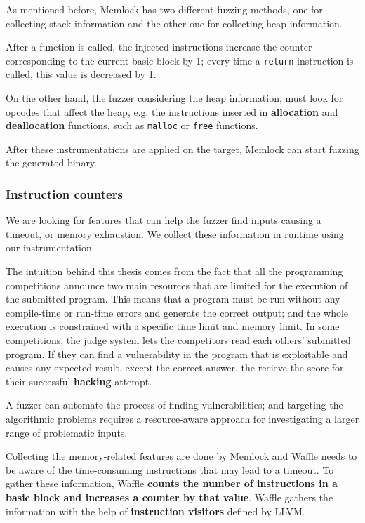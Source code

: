 As mentioned before, Memlock has two different fuzzing methods, one for collecting stack information and the other one for collecting heap information.

After a function is called, the injected instructions increase the counter corresponding to the current basic block by 1; every time a \texttt{return} instruction is called, this value is decreased by 1.

On the other hand, the fuzzer considering the heap information, must look for opcodes that affect the heap, e.g. the instructions inserted in \textbf{allocation} and \textbf{deallocation} functions, such as \texttt{malloc} or \texttt{free} functions.

After these instrumentations are applied on the target, Memlock can start fuzzing the generated binary.

\subsubsection{Instruction counters}

We are looking for features that can help the fuzzer find inputs causing a timeout, or memory exhaustion. We collect these information in runtime using our instrumentation.

The intuition behind this thesis comes from the fact that all the programming competitions announce two main resources that are limited for the execution of the submitted program. This means that a program must be run without any compile-time or run-time errors and generate the correct output; and the whole execution is constrained with a specific time limit and memory limit. \cite{manzoor2008common} In some competitions, the judge system lets the competitors read each others' submitted program. If they can find a vulnerability in the program that is exploitable and causes any expected result, except the correct answer, the recieve the score for their successful \textbf{hacking} attempt. \cite{wasik2018survey}

A fuzzer can automate the process of finding vulnerabilities; and targeting the algorithmic problems requires a resource-aware approach for investigating a larger range of problematic inputs.

Collecting the memory-related features are done by Memlock and Waffle needs to be aware of the time-consuming instructions that may lead to a timeout. To gather these information, Waffle \textbf{counts the number of instructions in a basic block and increases a counter by that value}. Waffle gathers the information with the help of \textbf{instruction visitors} defined by LLVM.

